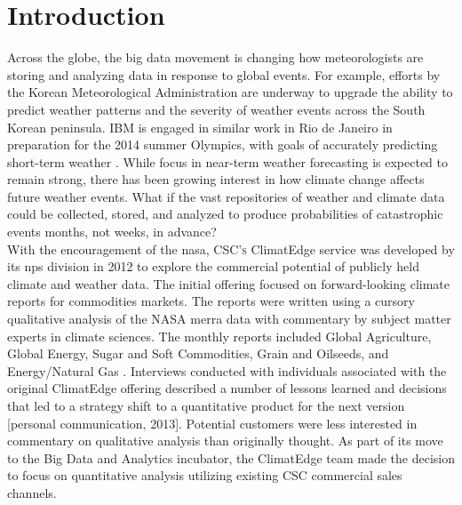 \section{Introduction}
Across the globe, the big data movement is changing how meteorologists are storing and analyzing data in response to global events. For example, efforts by the Korean Meteorological Administration are underway to upgrade the ability to predict weather patterns and the severity of weather events across the South Korean peninsula. IBM is engaged in similar work in Rio de Janeiro in preparation for the 2014 summer Olympics, with goals of accurately predicting short-term weather \cite{rwe}. While focus in near-term weather forecasting is expected to remain strong, there has been growing interest in how climate change affects future weather events. What if the vast repositories of weather and climate data could be collected, stored, and analyzed to produce probabilities of catastrophic events months, not weeks, in advance?\\

With the encouragement of the \gls{nasa}, \textsc{CSC's} ClimatEdge service was developed by its \gls{nps} division in 2012 to explore the commercial potential of publicly held climate and weather data. The initial offering focused on forward-looking climate reports for commodities markets. The reports were written using a cursory qualitative analysis of the NASA \gls{merra} data with commentary by subject matter experts in climate sciences. The monthly reports included Global Agriculture, Global Energy, Sugar and Soft Commodities, Grain and Oilseeds, and Energy/Natural Gas \cite{climatedgeurl}. Interviews conducted with individuals associated with the original ClimatEdge offering described a number of lessons learned and decisions that led to a strategy shift to a quantitative product for the next version [personal communication, 2013]. Potential customers were less interested in commentary on qualitative analysis than originally thought. As part of its move to the Big Data and Analytics incubator, the ClimatEdge team made the decision to focus on quantitative analysis utilizing existing CSC commercial sales channels.\\

